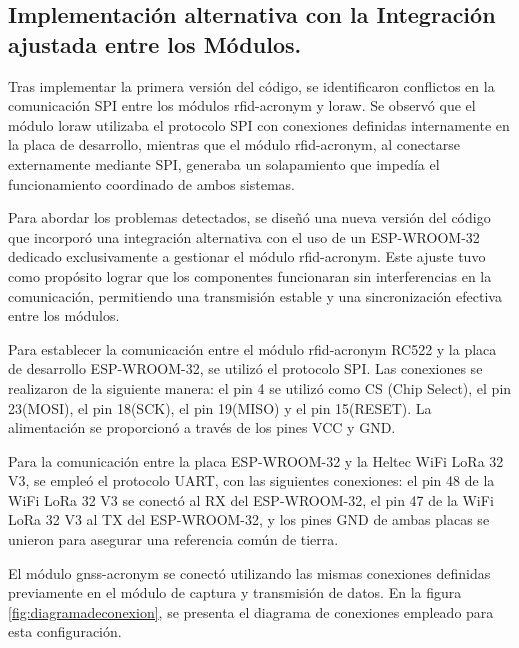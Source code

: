 \subsection{Implementación alternativa con la Integración ajustada entre los Módulos.}

Tras implementar la primera versión del código, se identificaron conflictos en la comunicación SPI entre los módulos \acrshort{rfid-acronym} y \acrshort{loraw}. Se observó que el módulo \acrshort{loraw} utilizaba el protocolo SPI con conexiones definidas internamente en la placa de desarrollo, mientras que el módulo \acrshort{rfid-acronym}, al conectarse externamente mediante SPI, generaba un solapamiento que impedía el funcionamiento coordinado de ambos sistemas.

Para abordar los problemas detectados, se diseñó una nueva versión del código que incorporó una integración alternativa con el uso de un ESP-WROOM-32 dedicado exclusivamente a gestionar el módulo \acrshort{rfid-acronym}. Este ajuste tuvo como propósito lograr que los componentes funcionaran sin interferencias en la comunicación, permitiendo una transmisión estable y una sincronización efectiva entre los módulos.

Para establecer la comunicación entre el módulo \acrshort{rfid-acronym} RC522 y la placa de desarrollo ESP-WROOM-32, se utilizó el protocolo SPI. Las conexiones se realizaron de la siguiente manera: el pin 4 se utilizó como CS (Chip Select), el pin 23(MOSI), el pin 18(SCK), el pin 19(MISO) y el pin 15(RESET). La alimentación se proporcionó a través de los pines VCC y GND.

Para la comunicación entre la placa ESP-WROOM-32 y la Heltec WiFi LoRa 32 V3, se empleó el protocolo UART, con las siguientes conexiones: el pin 48 de la WiFi LoRa 32 V3 se conectó al RX del ESP-WROOM-32, el pin 47 de la WiFi LoRa 32 V3 al TX del ESP-WROOM-32, y los pines GND de ambas placas se unieron para asegurar una referencia común de tierra.

El módulo \acrshort{gnss-acronym} se conectó utilizando las mismas conexiones definidas previamente en el módulo de captura y transmisión de datos. En la figura \ref{fig:diagramadeconexion}, se presenta el diagrama de conexiones empleado para esta configuración.

